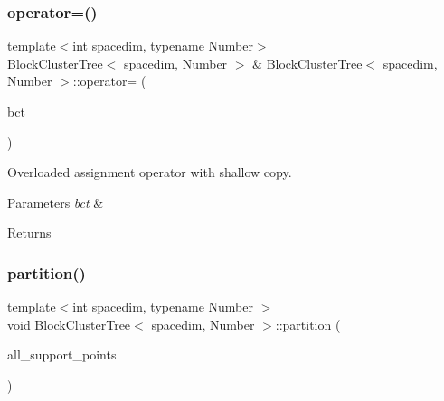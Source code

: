 \mbox{\label{classBlockClusterTree_aa635be81dfabed3ba455a17de3b65c2e}} 
\subsubsection{\texorpdfstring{operator=()}{operator=()}\hspace{0.1cm}{\footnotesize\ttfamily [2/2]}}
{\footnotesize\ttfamily template$<$int spacedim, typename Number$>$ \\
\hyperlink{classBlockClusterTree}{Block\+Cluster\+Tree}$<$ spacedim, Number $>$ \& \hyperlink{classBlockClusterTree}{Block\+Cluster\+Tree}$<$ spacedim, Number $>$\+::operator= (\begin{DoxyParamCaption}\item[{\hyperlink{classBlockClusterTree}{Block\+Cluster\+Tree}$<$ spacedim, Number $>$ \&\&}]{bct }\end{DoxyParamCaption})}

Overloaded assignment operator with shallow copy. 
\begin{DoxyParams}{Parameters}
{\em bct} & \\
\hline
\end{DoxyParams}
\begin{DoxyReturn}{Returns}

\end{DoxyReturn}
\mbox{\label{classBlockClusterTree_a3ca42421f732c20fc07bdf5d5ab94319}} 
\subsubsection{\texorpdfstring{partition()}{partition()}\hspace{0.1cm}{\footnotesize\ttfamily [1/2]}}
{\footnotesize\ttfamily template$<$int spacedim, typename Number $>$ \\
void \hyperlink{classBlockClusterTree}{Block\+Cluster\+Tree}$<$ spacedim, Number $>$\+::partition (\begin{DoxyParamCaption}\item[{const std\+::vector$<$ Point$<$ spacedim $>$$>$ \&}]{all\+\_\+support\+\_\+points }\end{DoxyParamCaption})}


